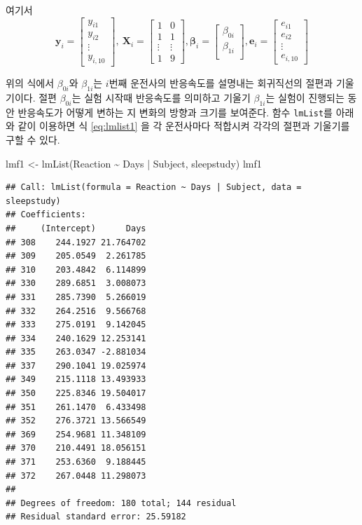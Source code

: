 \documentclass[
]{book}
\newenvironment{Shaded}{\begin{snugshade}}{\end{snugshade}}
\newcommand{\FunctionTok}[1]{\textcolor[rgb]{0.00,0.00,0.00}{#1}}
\newcommand{\NormalTok}[1]{#1}
\newcommand{\OtherTok}[1]{\textcolor[rgb]{0.56,0.35,0.01}{#1}}
\newcommand{\SpecialCharTok}[1]{\textcolor[rgb]{0.00,0.00,0.00}{#1}}
\theoremstyle{definition}
\theoremstyle{definition}
\theoremstyle{definition}
\theoremstyle{remark}
\begin{document}
여기서
\[
\bm y_i=\left[ \begin{array}{c}
y_{i1} \\
y_{i2} \\
\vdots \\
y_{i,10}
\end{array} \right],~ \bm X_i =
\left[ \begin{array}{cc}
1 & 0 \\
1 & 1 \\
\vdots & \vdots  \\
1 & 9 
\end{array} \right], \bm \beta_i=
\left[ \begin{array}{c}
\beta_{0i} \\
\beta_{1i} \\
\end{array} \right], \bm e_i= 
\left[ \begin{array}{c}
e_{i1} \\
e_{i2} \\
\vdots \\
e_{i,10}
\end{array} \right]
\]

위의 식에서 \(\beta_{0i}\)와 \(\beta_{1i}\)는 \(i\)번째 운전사의 반응속도를 설명내는 회귀직선의 절편과 기울기이다. 절편 \(\beta_{0i}\)는 실험 시작때 반응속도를 의미하고 기울기 \(\beta_{1i}\)는 실험이 진행되는 동안 반응속도가 어떻게 변하는 지 변화의 방향과 크기를 보여준다. 함수 \texttt{lmList}를 아래와 같이 이용하면 식 \eqref{eq:lmlist1} 을 각 운전사마다 적합시켜 각각의 절편과 기울기를 구할 수 있다.

\begin{Shaded}
\begin{Highlighting}[]
\NormalTok{lmf1 }\OtherTok{\textless{}{-}} \FunctionTok{lmList}\NormalTok{(Reaction }\SpecialCharTok{\textasciitilde{}}\NormalTok{ Days }\SpecialCharTok{|}\NormalTok{ Subject, sleepstudy)}
\NormalTok{lmf1}
\end{Highlighting}
\end{Shaded}

\begin{verbatim}
## Call: lmList(formula = Reaction ~ Days | Subject, data = sleepstudy) 
## Coefficients:
##     (Intercept)      Days
## 308    244.1927 21.764702
## 309    205.0549  2.261785
## 310    203.4842  6.114899
## 330    289.6851  3.008073
## 331    285.7390  5.266019
## 332    264.2516  9.566768
## 333    275.0191  9.142045
## 334    240.1629 12.253141
## 335    263.0347 -2.881034
## 337    290.1041 19.025974
## 349    215.1118 13.493933
## 350    225.8346 19.504017
## 351    261.1470  6.433498
## 352    276.3721 13.566549
## 369    254.9681 11.348109
## 370    210.4491 18.056151
## 371    253.6360  9.188445
## 372    267.0448 11.298073
## 
## Degrees of freedom: 180 total; 144 residual
## Residual standard error: 25.59182
\end{verbatim}
\end{document}
